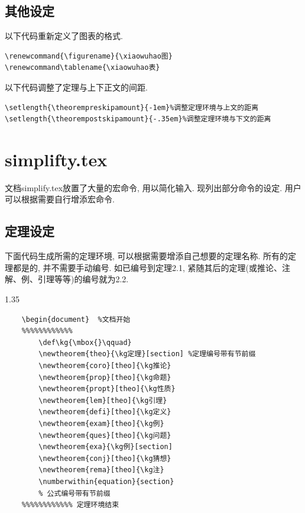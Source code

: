 \documentclass[a4paper,12pt,twoside]{ctexart}
\begin{document}
    \vspace*{-25pt}
    \subsection{其他设定}
以下代码重新定义了图表的格式.
    \begin{verbatim}
\renewcommand{\figurename}{\xiaowuhao图}
\renewcommand\tablename{\xiaowuhao表}
    \end{verbatim}\vspace*{0pt}

    \vspace*{-25pt}以下代码调整了定理与上下正文的间距.\vspace*{-10pt}
    \begin{verbatim}
\setlength{\theorempreskipamount}{-1em}%调整定理环境与上文的距离
\setlength{\theorempostskipamount}{-.35em}%调整定理环境与下文的距离
    \end{verbatim}\vspace*{-0pt}

\vspace*{-30pt}


\section{simplifty.tex}
    文档simplify.tex放置了大量的宏命令, 用以简化输入. 现列出部分命令的设定. 用户可以根据需要自行增添宏命令.
    \subsection{定理设定}
    下面代码生成所需的定理环境, 可以根据需要增添自己想要的定理名称. 所有的定理都是的, 并不需要手动编号. 如已编号到定理2.1, 紧随其后的定理(或推论、注解、例、引理等等)的编号就为2.2.
    \begin{spacing}{1.35}
    \begin{verbatim}
    \begin{document}  %文档开始
    %%%%%%%%%%%%
        \def\kg{\mbox{}\qquad}
        \newtheorem{theo}{\kg定理}[section] %定理编号带有节前缀
        \newtheorem{coro}[theo]{\kg推论}
        \newtheorem{prop}[theo]{\kg命题}
        \newtheorem{propt}[theo]{\kg性质}
        \newtheorem{lem}[theo]{\kg引理}
        \newtheorem{defi}[theo]{\kg定义}
        \newtheorem{exam}[theo]{\kg例}
        \newtheorem{ques}[theo]{\kg问题}
        \newtheorem{exa}{\kg例}[section]
        \newtheorem{conj}[theo]{\kg猜想}
        \newtheorem{rema}[theo]{\kg注}
        \numberwithin{equation}{section}
        % 公式编号带有节前缀
    %%%%%%%%%%%% 定理环境结束
    \end{verbatim}
    \end{spacing}\vspace*{-0pt}
\end{document}
